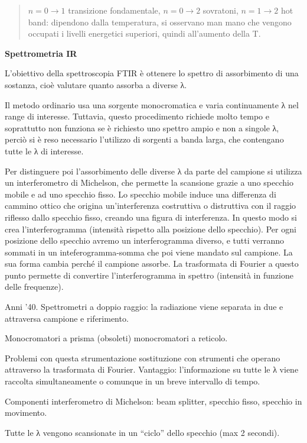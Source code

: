 \begin{quote}
\(n = 0 \rightarrow 1\) transizione fondamentale,
\(n = 0 \rightarrow 2\) sovratoni, \(n = 1 \rightarrow 2\) hot band:
dipendono dalla temperatura, si osservano man mano che vengono occupati
i livelli energetici superiori, quindi all'aumento della T.
\end{quote}

\textbf{Spettrometria IR}

L'obiettivo della spettroscopia FTIR è ottenere lo spettro di
assorbimento di una sostanza, cioè valutare quanto assorba a diverse λ.

Il metodo ordinario usa una sorgente monocromatica e varia continuamente
λ nel range di interesse. Tuttavia, questo procedimento richiede molto
tempo e soprattutto non funziona se è richiesto uno spettro ampio e non
a singole λ, perciò si è reso necessario l'utilizzo di sorgenti a banda
larga, che contengano tutte le λ di interesse.

Per distinguere poi l'assorbimento delle diverse λ da parte del campione
si utilizza un interferometro di Michelson, che permette la scansione
grazie a uno specchio mobile e ad uno specchio fisso. Lo specchio mobile
induce una differenza di cammino ottico che origina un'interferenza
costruttiva o distruttiva con il raggio riflesso dallo specchio fisso,
creando una figura di interferenza. In questo modo si crea
l'interferogramma (intensità rispetto alla posizione dello specchio).
Per ogni posizione dello specchio avremo un interferogramma diverso, e
tutti verranno sommati in un inteferogramma-somma che poi viene mandato
sul campione. La sua forma cambia perché il campione assorbe. La
trasformata di Fourier a questo punto permette di convertire
l'interferogramma in spettro (intensità in funzione delle frequenze).

Anni '40. Spettrometri a doppio raggio: la radiazione viene separata in
due e attraversa campione e riferimento.

Monocromatori a prisma (obsoleti) monocromatori a reticolo.

Problemi con questa strumentazione sostituzione con strumenti che
operano attraverso la trasformata di Fourier. Vantaggio: l'informazione
su tutte le λ viene raccolta simultaneamente o comunque in un breve
intervallo di tempo.

Componenti interferometro di Michelson: beam splitter, specchio fisso,
specchio in movimento.

Tutte le λ vengono scansionate in un ``ciclo'' dello specchio (max 2
secondi).

